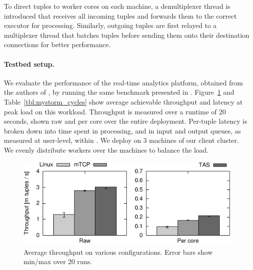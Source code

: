 To direct tuples to worker cores on each machine, a demultiplexer
thread is introduced that receives all incoming tuples and forwards
them to the correct executor for processing. Similarly, outgoing
tuples are first relayed to a multiplexer thread that batches tuples
before sending them onto their destination connections for better
performance.


\paragraph{Testbed setup.} We evaluate the performance of the \mystorm
real-time analytics platform, obtained from the authors of
\cite{flexnic}, by running the same
benchmark presented in \cite{flexnic}. %
Figure~\ref{fig:mystorm_throughput} and Table~\ref{tbl:mystorm_cycles}
show average achievable throughput and latency at peak load on this
workload. Throughput is measured over a runtime of 20 seconds, shown
raw and per core over the entire deployment. Per-tuple latency is
broken down into time spent in processing, and in input and output
queues, as measured at user-level, within \mystorm. We deploy \mystorm
on 3 machines of our client cluster. We evenly distribute workers
over the machines to balance the load.

\begin{figure}
  \centering
  \includegraphics[width=\columnwidth]{plots/storm_tput/storm_tput_split.pdf}
  \caption{Average throughput on various \mystorm
    configurations. Error bars show min/max over 20 runs.}
  \label{fig:mystorm_throughput}
\end{figure}

